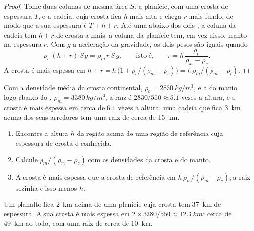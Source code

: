 \begin{proof}
Tome duas colunas de mesma área $S$: a planície, com uma crosta de
espessura $T$, e a cadeia, cuja crosta fica $h$ mais alta e chega $r$ mais
fundo, de modo que a sua espessura é $T + h + r$. Até uma  abaixo dos dois , a coluna da cadeia tem $h + r$ de crosta
a mais; a coluna da planície tem, em vez disso, manto na espessura $r$. Com
$g$ a aceleração da gravidade, os dois pesos são iguais quando
\[
  \rho_c\,(h + r)\,S\,g = \rho_m\,r\,S\,g,
  \qquad\text{isto é,}\qquad
  r = h\,\frac{\rho_c}{\rho_m - \rho_c}.
\]
A crosta é mais espessa em $h + r = h\,\bigl(1 + \rho_c/(\rho_m - \rho_c)\bigr)
= h\,\rho_m/(\rho_m - \rho_c)$.
\end{proof}

Com a densidade média da crosta continental, $\rho_c =
\qty{2830}{kg/m^3}$, e a do manto logo abaixo do , $\rho_m =
\qty{3380}{kg/m^3}$, a raiz é $2830/550 \approx 5.1$ vezes a altura, e a
crosta é mais espessa em cerca de $6.1$ vezes a altura: uma cadeia que fica
\qty{3}{km} acima dos seus arredores tem uma raiz de cerca de \qty{15}{km}.

\begin{method}\label{met:g11:lithosphere-asthenosphere:root}
\begin{enumerate}
  \item Encontre a altura $h$ da região acima de uma região de referência
        cuja espessura de crosta é conhecida.
  \item Calcule $\rho_m/(\rho_m - \rho_c)$ com as densidades da crosta e do
        manto.
  \item A crosta é mais espessa que a crosta de referência em $h\,\rho_m/(\rho_m -
        \rho_c)$; a raiz sozinha é isso menos $h$.
\end{enumerate}
\end{method}

\begin{example}\label{ex:g11:lithosphere-asthenosphere:plateau}
Um planalto fica \qty{2}{km} acima de uma planície cuja crosta tem
\qty{37}{km} de espessura. A sua crosta é mais espessa em $2 \times 3380/550 \approx \qty{12.3}{km}$:
cerca de \qty{49}{km} ao todo, com uma raiz de cerca de \qty{10}{km}.
\end{example}

